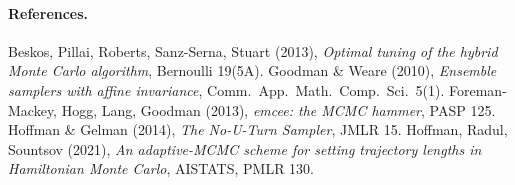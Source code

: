 \documentclass[11pt]{article}
\begin{document}
\paragraph{References.}
{\footnotesize
Beskos, Pillai, Roberts, Sanz-Serna, Stuart (2013), \emph{Optimal tuning of the
hybrid Monte Carlo algorithm}, Bernoulli 19(5A). \;
Goodman \& Weare (2010), \emph{Ensemble samplers with affine invariance}, Comm.\
App.\ Math.\ Comp.\ Sci.\ 5(1). \;
Foreman-Mackey, Hogg, Lang, Goodman (2013), \emph{emcee: the MCMC hammer}, PASP
125. \;
Hoffman \& Gelman (2014), \emph{The No-U-Turn Sampler}, JMLR 15. \;
Hoffman, Radul, Sountsov (2021), \emph{An adaptive-MCMC scheme for setting
trajectory lengths in Hamiltonian Monte Carlo}, AISTATS, PMLR 130.
}
\end{document}
